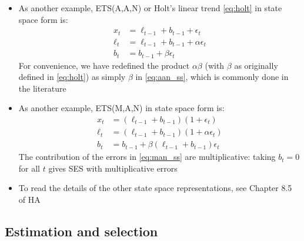 \documentclass{article}
\begin{document}
\begin{itemize}
\item As another example, ETS(A,A,N) or Holt's linear trend \eqref{eq:holt} in 
  state space form is: 
  \begin{equation}
  \label{eq:aan_ss}
  \begin{aligned}
  x_t &= \ell_{t-1} + b_{t-1} + \epsilon_t \\
  \ell_t &= \ell_{t-1} + b_{t-1} + \alpha \epsilon_t \\
  b_t &= b_{t-1} + \beta \epsilon_t
  \end{aligned}
  \end{equation}
  For convenience, we have redefined the product $\alpha \beta$ (with $\beta$ as
  originally defined in \eqref{eq:holt}) as simply $\beta$ in \eqref{eq:aan_ss},
  which is commonly done in the literature  

\item As another example, ETS(M,A,N) in state space form is: 
  \begin{equation}
  \label{eq:man_ss}
  \begin{aligned}
  x_t &= (\ell_{t-1} + b_{t-1})(1 + \epsilon_t) \\
  \ell_t &= (\ell_{t-1} + b_{t-1})(1 + \alpha \epsilon_t) \\
  b_t &= b_{t-1} + \beta (\ell_{t-1} + b_{t-1}) \epsilon_t 
  \end{aligned}
  \end{equation}
  The contribution of the errors in \eqref{eq:man_ss} are multiplicative: taking
  $b_t = 0$ for all $t$ gives SES with multiplicative errors

\item To read the details of the other state space representations, see Chapter
  8.5 of HA
\end{itemize}

\subsection{Estimation and selection}
\end{document}
